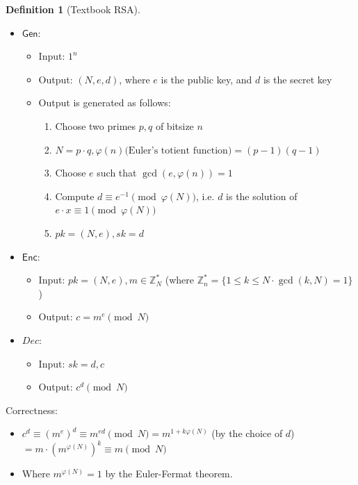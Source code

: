 \documentclass[11pt]{article}
\theoremstyle{definition}
\newtheorem{definition}{Definition}[section]
\theoremstyle{proof}
\newcommand{\Gen}{\mathsf{Gen}}
\newcommand{\Enc}{\mathsf{Enc}}
\begin{document}
\begin{definition}[Textbook RSA]
	\leavevmode
	\begin{itemize}
		\item $\Gen$:
		\begin{itemize}
			\item Input: $1^n$
			\item Output: $(N, e, d)$, where $e$ is the public key, and $d$ is the secret key
			\item Output is generated as follows:
			\begin{enumerate}
				\item Choose two primes $p, q$ of bitsize $n$
				\item $N = p \cdot q, \varphi(n) \text{(Euler's totient function)} = (p-1)(q-1)$
				\item Choose $e$ such that $\gcd(e, \varphi(n)) = 1$
				\item Compute $d \equiv e^{-1} \pmod{\varphi(N)}$, i.e. $d$ is the solution of $e \cdot x \equiv 1 \pmod{\varphi(N)}$
				\item $pk = (N, e), sk = d$
			\end{enumerate}
		\end{itemize}
		\item $\Enc$:
		\begin{itemize}
			\item Input: $pk = (N, e), m \in \mathbb{Z}_N^*$ (where $\mathbb{Z}_n^* = \{1 \le k \le N \cdot \gcd(k, N) = 1\}$)
			\item Output: $c = m^e \pmod{N}$
		\end{itemize}
		\item $Dec$:
		\begin{itemize}
			\item Input: $sk = d, c$
			\item Output: $c^d \pmod{N}$
		\end{itemize}
	\end{itemize}
\end{definition}

Correctness:

\begin{itemize}
	\item $c^d \equiv (m^e)^d \equiv m^{ed} \pmod{N} = m^{1+k \varphi(N)}$ (by the choice of $d$) $= m \cdot (m^{\varphi(N)})^k \equiv m \pmod{N}$
	\item Where $m^{\varphi(N)} = 1$ by the Euler-Fermat theorem.
\end{itemize}
\end{document}
